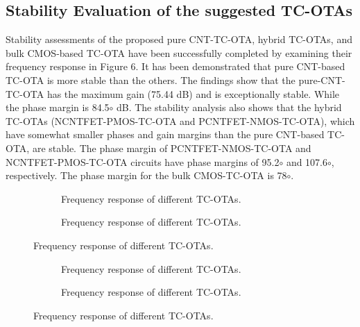 \subsection*{Stability Evaluation of the suggested TC-OTAs}

Stability assessments of the proposed pure CNT-TC-OTA, hybrid TC-OTAs, and bulk
CMOS-based TC-OTA have been successfully completed by examining their frequency
response in Figure 6. It has been demonstrated that pure CNT-based TC-OTA is
more stable than the others. The findings show that the pure-CNT-TC-OTA has the
maximum gain (75.44 dB) and is exceptionally stable. While the phase margin is
84.5$\circ$ dB. The stability analysis also shows that the hybrid TC-OTAs
(NCNTFET-PMOS-TC-OTA and PCNTFET-NMOS-TC-OTA), which have somewhat smaller
phases and gain margins than the pure CNT-based TC-OTA, are stable. The phase
margin of PCNTFET-NMOS-TC-OTA and NCNTFET-PMOS-TC-OTA circuits have phase
margins of 95.2$\circ$ and 107.6$\circ$, respectively. The phase margin for the
bulk CMOS-TC-OTA is 78$\circ$.

\begin{figure}[htbp]
  \centering
  \begin{subfigure}[b]{0.48\linewidth}
    \centering
    \caption{Frequency response of different TC-OTAs.}

  \end{subfigure}
  \hfill
  \begin{subfigure}[b]{0.48\linewidth}
    \centering
    \caption{Frequency response of different TC-OTAs.}

  \end{subfigure}
  \caption{Frequency response of different TC-OTAs.}

  \label{fig:group_e28g2}
\end{figure}

\begin{figure}[htbp]
  \centering
  \begin{subfigure}[b]{0.48\linewidth}
    \centering
    \caption{Frequency response of different TC-OTAs.}

  \end{subfigure}
  \hfill
  \begin{subfigure}[b]{0.48\linewidth}
    \centering
    \caption{Frequency response of different TC-OTAs.}

  \end{subfigure}
  \caption{Frequency response of different TC-OTAs.}

  \label{fig:group_s90gd}
\end{figure}


